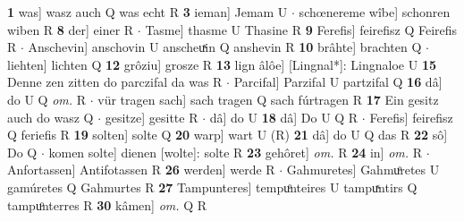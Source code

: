 \documentclass[8pt,a4paper,notitlepage]{article}
\begin{document}
\begin{table}[ht]
\begin{minipage}[t]{0.5\linewidth}
\textbf{1} was] wasz auch Q was echt R \textbf{3} ieman] Jemam U  $\cdot$ schœnereme wîbe] schonren wiben R \textbf{8} der] einer R  $\cdot$ Tasme] thasme U Thasine R \textbf{9} Ferefis] feirefisz Q Feirefis R  $\cdot$ Anschevin] anschovin U anscheuͯin Q anshevin R \textbf{10} brâhte] brachten Q  $\cdot$ liehten] lichten Q \textbf{12} grôziu] grosze R \textbf{13} lign âlôe] [Lingnal*]: Lingnaloe U \textbf{15} Denne zen zitten do parczifal da was R  $\cdot$ Parcifal] Parzifal U partzifal Q \textbf{16} dâ] do U Q \textit{om.} R  $\cdot$ vür tragen sach] sach tragen Q sach fúrtragen R \textbf{17} Ein gesitz auch do wasz Q  $\cdot$ gesitze] gesitte R  $\cdot$ dâ] do U \textbf{18} dâ] Do U Q R  $\cdot$ Ferefis] feirefisz Q feriefis R \textbf{19} solten] solte Q \textbf{20} warp] wart U (R) \textbf{21} dâ] do U Q das R \textbf{22} sô] Do Q  $\cdot$ komen solte] dienen [wolte]: solte R \textbf{23} gehôret] \textit{om.} R \textbf{24} in] \textit{om.} R  $\cdot$ Anfortassen] Antifotassen R \textbf{26} werden] werde R  $\cdot$ Gahmuretes] Gahmuͦretes U gamúretes Q Gahmurtes R \textbf{27} Tampunteres] tempuͦnteires U tampuͯntirs Q tampuͦnterres R \textbf{30} kâmen] \textit{om.} Q R \newline
\end{minipage}
\end{table}
\end{document}
